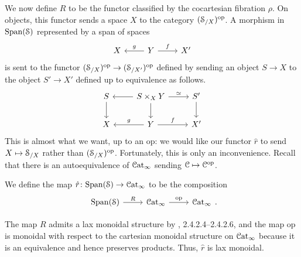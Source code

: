 \documentclass[main.tex]{subfiles}
\begin{document}
We now define $R$ to be the functor classified by the cocartesian fibration $\rho$. On objects, this functor sends a space $X$ to the category $(\S_{/X})\op$. A morphism in $\Span(\S)$ represented by a span of spaces
\begin{equation*}
  \begin{tikzcd}
    X
    & Y
    \arrow[l, swap, "g"]
    \arrow[r, "f"]
    & X'
  \end{tikzcd}
\end{equation*}
is sent to the functor $(\S_{/X})\op \to (\S_{/X'})\op$ defined by sending an object $S \to X$ to the object $S' \to X'$ defined up to equivalence as follows.
\begin{equation*}
  \begin{tikzcd}
    S
    \arrow[d]
    & S \times_{X} Y
    \arrow[l]
    \arrow[r, "\simeq"]
    \arrow[d]
    & S'
    \arrow[d]
    \\
    X
    & Y
    \arrow[l, swap, "g"]
    \arrow[r, "f"]
    & X'
  \end{tikzcd}
\end{equation*}
This is almost what we want, up to an $\mathrm{op}$: we would like our functor $\hat{r}$ to send $X \mapsto \S_{/X}$ rather than $(\S_{/X})\op$. Fortunately, this is only an inconvenience. Recall that there is an autoequivalence of $\ICat$ sending $\category{C} \mapsto \category{C}\op$.
\begin{definition}
  We define the map $\hat{r}\colon \Span(\S) \to \ICat$ to be the composition
  \begin{equation*}
    \begin{tikzcd}
      \Span(\S)
      \arrow[r, "R"]
      & \ICat
      \arrow[r, "\mathrm{op}"]
      & \ICat
    \end{tikzcd}.
  \end{equation*}
\end{definition}

The map $R$ admits a lax monoidal structure by \cite{luriehigheralgebra}, 2.4.2.4--2.4.2.6, and the map $\mathrm{op}$ is monoidal with respect to the cartesian monoidal structure on $\ICat$ because it is an equivalence and hence preserves products. Thus, $\hat{r}$ is lax monoidal.
\end{document}
